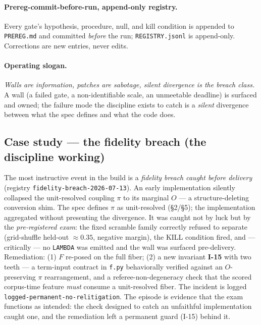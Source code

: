 \documentclass[11pt]{article}
\newcommand{\code}[1]{\texttt{\small #1}}
\begin{document}
\paragraph{Prereg-commit-before-run, append-only registry.} Every gate's
hypothesis, procedure, null, and kill condition is appended to \code{PREREG.md} and
committed \emph{before} the run; \code{REGISTRY.jsonl} is append-only. Corrections
are new entries, never edits.

\paragraph{Operating slogan.} \emph{Walls are information, patches are sabotage,
silent divergence is the breach class.} A wall (a failed gate, a non-identifiable
scale, an unmeetable deadline) is surfaced and owned; the failure mode the
discipline exists to catch is a \emph{silent} divergence between what the spec
defines and what the code does.

\subsection*{Case study --- the fidelity breach (the discipline working)}

The most instructive event in the build is a \emph{fidelity breach caught before
delivery} (registry \code{fidelity-breach-2026-07-13}). An early implementation
silently collapsed the unit-resolved coupling $\pi$ to its marginal $O$ --- a
structure-deleting conversion shim. The spec defines $\pi$ as unit-resolved
(\S2/\S5); the implementation aggregated without presenting the divergence. It was
caught not by luck but by the \emph{pre-registered exam}: the fixed scramble family
correctly refused to separate (grid-shuffle held-out $\approx 0.35$, negative
margin), the KILL condition fired, and --- critically --- no \code{LAMBDA} was
emitted and the wall was surfaced pre-delivery. Remediation: (1) $F$ re-posed on
the full fiber; (2) a new invariant \textbf{I-15} with two teeth --- a term-input
contract in \code{f.py} behaviorally verified against an $O$-preserving $\pi$
rearrangement, and a referee-non-degeneracy check that the scored corpus-time
feature \emph{must} consume a unit-resolved fiber. The incident is logged
\code{logged-permanent-no-relitigation}. The episode is evidence that the exam
functions as intended: the check designed to catch an unfaithful implementation
caught one, and the remediation left a permanent guard (I-15) behind it.
\end{document}
